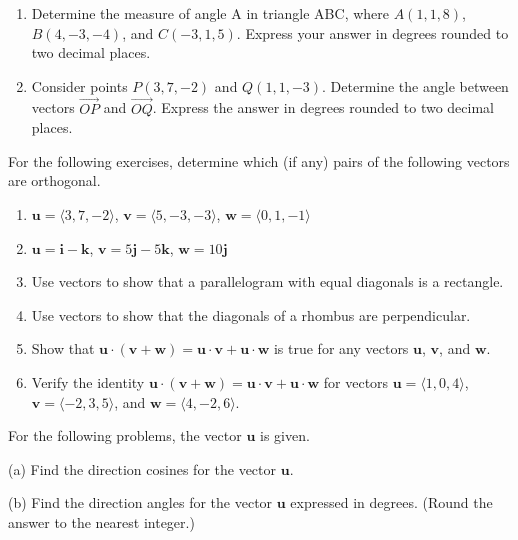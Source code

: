 \documentclass{exercises}
\begin{document}
\begin{enumerate}[resume]
\begin{enumerate}[label=(\alph*)]
  \item Determine the measure of angle B in triangle ABC. Express the answer in degrees rounded to two decimal places.
\end{enumerate}
\item Determine the measure of angle A in triangle ABC, where $A(1,1,8)$, $B(4,-3,-4)$, and $C(-3,1,5)$. Express your answer in degrees rounded to two decimal places.
\item Consider points $P(3,7,-2)$ and $Q(1,1,-3)$. Determine the angle between vectors $\overset{\to}{OP}$ and $\overset{\to}{OQ}$. Express the answer in degrees rounded to two decimal places.
\end{enumerate}

For the following exercises, determine which (if any) pairs of the following vectors are orthogonal.

\begin{enumerate}[resume]
\item $\mathbf{u}=\langle3,7,-2\rangle$, $\mathbf{v}=\langle5,-3,-3\rangle$, $\mathbf{w}=\langle0,1,-1\rangle$
\item $\mathbf{u}=\mathbf{i}-\mathbf{k}$, $\mathbf{v}=5\mathbf{j}-5\mathbf{k}$, $\mathbf{w}=10\mathbf{j}$
\item Use vectors to show that a parallelogram with equal diagonals is a rectangle.
\item Use vectors to show that the diagonals of a rhombus are perpendicular.
\item Show that $\mathbf{u}\cdot(\mathbf{v}+\mathbf{w})=\mathbf{u}\cdot \mathbf{v}+\mathbf{u}\cdot \mathbf{w}$ is true for any vectors $\mathbf{u}$, $\mathbf{v}$, and $\mathbf{w}$.
\item Verify the identity $\mathbf{u}\cdot(\mathbf{v}+\mathbf{w})=\mathbf{u}\cdot \mathbf{v}+\mathbf{u}\cdot \mathbf{w}$ for vectors $\mathbf{u}=\langle1,0,4\rangle$, $\mathbf{v}=\langle-2,3,5\rangle$, and $\mathbf{w}=\langle4,-2,6\rangle$.
\end{enumerate}

For the following problems, the vector $\mathbf{u}$ is given.


(a) Find the direction cosines for the vector $\mathbf{u}$.


(b) Find the direction angles for the vector $\mathbf{u}$ expressed in degrees. (Round the answer to the nearest integer.)
\end{document}

